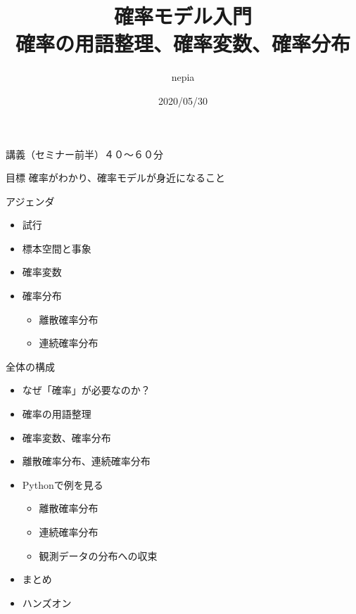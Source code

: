 \documentclass[dvipdfmx,cjk,handout]{beamer}
\title{確率モデル入門\\確率の用語整理、確率変数、確率分布}
\author{nepia}
\institute{Liberal Arts for Tech}
\date{2020/05/30}
\begin{document}
\begin{frame}
  \titlepage
\end{frame}




\begin{frame}{講義（セミナー前半）４０〜６０分}\pause

\begin{block}{目標}
    確率がわかり、確率モデルが身近になること
\end{block}
\pause

\vskip 1cm

\begin{block}{アジェンダ}
    \begin{itemize}
    \item 試行
    \item 標本空間と事象
    \item 確率変数
    \item 確率分布
        \begin{itemize}
        \item 離散確率分布
        \item 連続確率分布
        \end{itemize}
    \end{itemize}
\end{block}

\end{frame}


\begin{frame}{全体の構成}

\begin{itemize}
    \item なぜ「確率」が必要なのか？
    \item 確率の用語整理
    \item 確率変数、確率分布
    \item 離散確率分布、連続確率分布
    \item Pythonで例を見る
        \begin{itemize}
        \item 離散確率分布
        \item 連続確率分布
        \item 観測データの分布への収束
        \end{itemize}
    \item まとめ
    \item ハンズオン
\end{itemize}

\end{frame}
\end{document}
